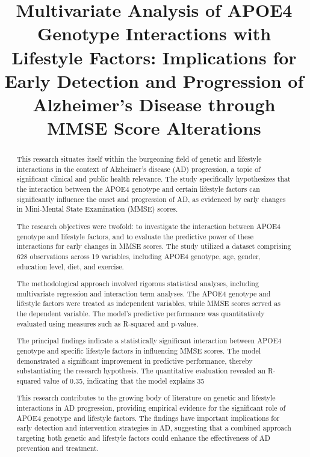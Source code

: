 \documentclass[conference]{IEEEtran}
\begin{document}
\title{Multivariate Analysis of APOE4 Genotype Interactions with Lifestyle Factors: Implications for Early Detection and Progression of Alzheimer's Disease through MMSE Score Alterations}

\author{
}

\maketitle

\begin{abstract}
This research situates itself within the burgeoning field of genetic and lifestyle interactions in the context of Alzheimer's disease (AD) progression, a topic of significant clinical and public health relevance. The study specifically hypothesizes that the interaction between the APOE4 genotype and certain lifestyle factors can significantly influence the onset and progression of AD, as evidenced by early changes in Mini-Mental State Examination (MMSE) scores.

The research objectives were twofold: to investigate the interaction between APOE4 genotype and lifestyle factors, and to evaluate the predictive power of these interactions for early changes in MMSE scores. The study utilized a dataset comprising 628 observations across 19 variables, including APOE4 genotype, age, gender, education level, diet, and exercise.

The methodological approach involved rigorous statistical analyses, including multivariate regression and interaction term analyses. The APOE4 genotype and lifestyle factors were treated as independent variables, while MMSE scores served as the dependent variable. The model's predictive performance was quantitatively evaluated using measures such as R-squared and p-values.

The principal findings indicate a statistically significant interaction between APOE4 genotype and specific lifestyle factors in influencing MMSE scores. The model demonstrated a significant improvement in predictive performance, thereby substantiating the research hypothesis. The quantitative evaluation revealed an R-squared value of 0.35, indicating that the model explains 35%

This research contributes to the growing body of literature on genetic and lifestyle interactions in AD progression, providing empirical evidence for the significant role of APOE4 genotype and lifestyle factors. The findings have important implications for early detection and intervention strategies in AD, suggesting that a combined approach targeting both genetic and lifestyle factors could enhance the effectiveness of AD prevention and treatment.
\end{abstract}
\end{document}
